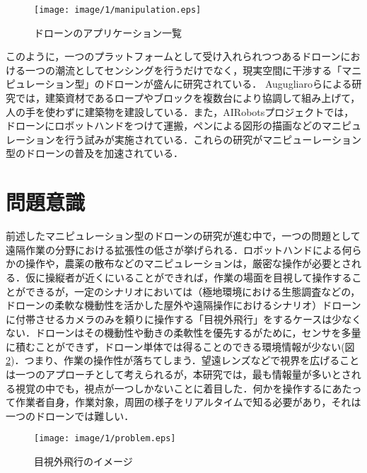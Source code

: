 \begin{figure}[htbp]
 \begin{center}
  \texttt{[image: image/1/manipulation.eps]}
 \end{center}
 \caption{ドローンのアプリケーション一覧 }
 \label{application}
\end{figure} 

このように，一つのプラットフォームとして受け入れられつつあるドローンにおける一つの潮流としてセンシングを行うだけでなく，現実空間に干渉する「マニピュレーション型」のドローンが盛んに研究されている．
Augugliaroらによる研究では\cite{augugliaro2014flight}\cite{augugliaro2013flight}，建築資材であるロープやブロックを複数台により協調して組み上げて，人の手を使わずに建築物を建設している．また，AIRobotsプロジェクトでは\cite{marconi2012aerial}，ドローンにロボットハンドをつけて運搬，ペンによる図形の描画などのマニピュレーションを行う試みが実施されている．これらの研究がマニピューレーション型のドローンの普及を加速されている．

\section{問題意識}
前述したマニピュレーション型のドローンの研究が進む中で，一つの問題として遠隔作業の分野における拡張性の低さが挙げられる．ロボットハンドによる何らかの操作や，農薬の散布などのマニピュレーションは，厳密な操作が必要とされる．仮に操縦者が近くにいることができれば，作業の場面を目視して操作することができるが，一定のシナリオにおいては（極地環境における生態調査などの，ドローンの柔軟な機動性を活かした屋外や遠隔操作におけるシナリオ）ドローンに付帯させるカメラのみを頼りに操作する「目視外飛行」をするケースは少なくない．ドローンはその機動性や動きの柔軟性を優先するがために，センサを多量に積むことができず，ドローン単体では得ることのできる環境情報が少ない(図\ref{problem})．つまり、作業の操作性が落ちてしまう．望遠レンズなどで視界を広げることは一つのアプローチとして考えられるが，本研究では，最も情報量が多いとされる視覚の中でも，視点が一つしかないことに着目した．何かを操作するにあたって作業者自身，作業対象，周囲の様子をリアルタイムで知る必要があり，それは一つのドローンでは難しい．

\begin{figure}[htbp]
 \begin{center}
  \texttt{[image: image/1/problem.eps]}
 \end{center}
 \caption{目視外飛行のイメージ}
 \label{problem}
\end{figure} 

